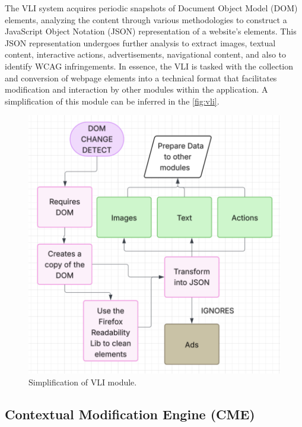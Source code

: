 \documentclass[conference]{IEEEtran}
\begin{document}
The VLI system acquires periodic snapshots of Document Object Model (DOM) elements, analyzing the content through various methodologies to construct a JavaScript Object Notation (JSON) representation of a website's elements. This JSON representation undergoes further analysis to extract images, textual content, interactive actions, advertisements, navigational content, and also to identify WCAG infringements. In essence, the VLI is tasked with the collection and conversion of webpage elements into a technical format that facilitates modification and interaction by other modules within the application. A simplification of this module can be inferred in the \autoref{fig:vli}.

\begin{figure}[h]
\centering
\includegraphics[width=\columnwidth]{images/VLI.png}
\caption{Simplification of VLI module.}
\label{fig:vli}
\end{figure}


\subsection{Contextual Modification Engine (CME)}
\end{document}
